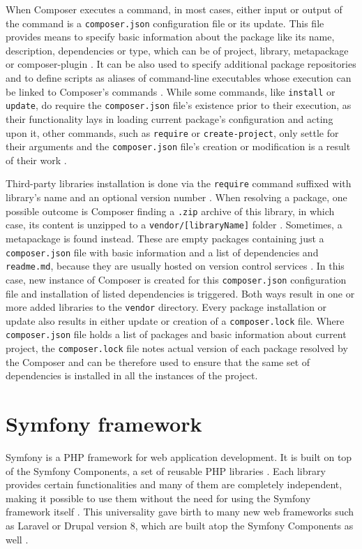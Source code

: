When Composer executes a command, in most cases, either input or output of the command is a \texttt{composer.json} configuration file or its update. This file provides means to specify basic information about the package like its name, description, dependencies or type, which can be of project, library, metapackage or composer-plugin \citep{composer.docs}. It can be also used to specify additional package repositories and to define scripts as aliases of command-line executables whose execution can be linked to Composer's commands \citep{composer.docs}. While some commands, like \texttt{install} or \texttt{update}, do require the \texttt{composer.json} file's existence prior to their execution, as their functionality lays in loading current package's configuration and acting upon it, other commands, such as \texttt{require} or \texttt{create-project}, only settle for their arguments and the \texttt{composer.json} file's creation or modification is a result of their work \citep{composer.docs}.

Third-party libraries installation is done via the \texttt{require} command suffixed with library's name and an optional version number \citep{composer.docs}. When resolving a package, one possible outcome is Composer finding a \texttt{.zip} archive of this library, in which case, its content is unzipped to a \texttt{vendor/[libraryName]} folder \citep{composer.docs}. Sometimes, a metapackage is found instead. These are empty packages containing just a \texttt{composer.json} file with basic information and a list of dependencies and \texttt{readme.md}, because they are usually hosted on version control services \citep{composer.docs}. In this case, new instance of Composer is created for this \texttt{composer.json} configuration file and installation of listed dependencies is triggered. Both ways result in one or more added libraries to the \texttt{vendor} directory. Every package installation or update also results in either update or creation of a \texttt{composer.lock} file. Where \texttt{composer.json} file holds a list of packages and basic information about current project, the \texttt{composer.lock} file notes actual version of each package resolved by the Composer and can be therefore used to ensure that the same set of dependencies is installed in all the instances of the project. 





\section{Symfony framework}
Symfony is a PHP framework for web application development. It is built on top of the Symfony Components, a set of reusable PHP libraries \citep{symfony.reference}. Each library provides certain functionalities and many of them are completely independent, making it possible to use them without the need for using the Symfony framework itself \citep{symfony.reference}. This universality gave birth to many new web frameworks such as Laravel or Drupal version 8, which are built atop the Symfony Components as well \citep{symfony.reference}.

